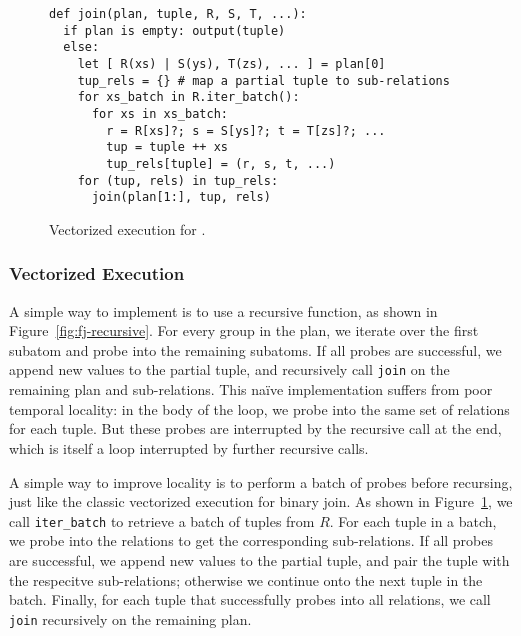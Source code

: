 \begin{figure}
  \begin{lstlisting}
def join(plan, tuple, R, S, T, ...):
  if plan is empty: output(tuple)
  else:
    let [ R(xs) | S(ys), T(zs), ... ] = plan[0]
    tup_rels = {} # map a partial tuple to sub-relations
    for xs_batch in R.iter_batch():
      for xs in xs_batch:
        r = R[xs]?; s = S[ys]?; t = T[zs]?; ...
        tup = tuple ++ xs
        tup_rels[tuple] = (r, s, t, ...)
    for (tup, rels) in tup_rels:
      join(plan[1:], tup, rels)
\end{lstlisting}
  \caption{Vectorized execution for \FJ.}
  \label{fig:vectorized-execution}
\end{figure}

\subsubsection{Vectorized Execution}\label{sec:vectorized-execution}
A simple way to implement \FJ is to use a recursive function,
as shown in Figure~\ref{fig:fj-recursive}.
For every group in the \FJ plan,
we iterate over the first subatom and probe into the remaining subatoms.
If all probes are successful, we append new values to the partial tuple,
and recursively call \lstinline|join| on the remaining plan and sub-relations.
This na\"ive implementation suffers from poor temporal locality:
in the body of the loop,
we probe into the same set of relations for each tuple.
But these probes are interrupted by the recursive
call at the end,
which is itself a loop interrupted by further recursive calls.

A simple way to improve locality is to perform a batch of probes
before recursing, just like the classic vectorized execution
for binary join.
As shown in Figure~\ref{fig:vectorized-execution},
we call \lstinline|iter_batch| to retrieve a batch of tuples from $R$.
For each tuple in a batch,
we probe into the relations to get the corresponding sub-relations.
If all probes are successful, we append new values to the partial tuple,
and pair the tuple with the respecitve sub-relations;
otherwise we continue onto the next tuple in the batch.
Finally, for each tuple that successfully probes into all relations,
we call \lstinline|join| recursively on the remaining plan.


